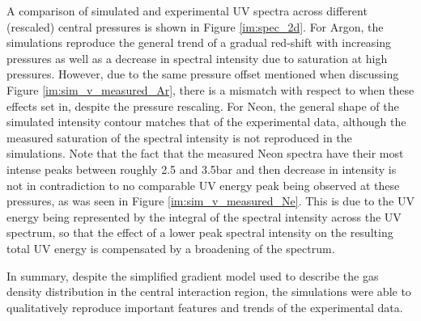 \documentclass[a4paper]{jpconf}
\begin{document}
A comparison of simulated and experimental UV spectra across different (rescaled) central pressures is shown in Figure \ref{im:spec_2d}. For Argon, the simulations reproduce the general trend of a gradual red-shift with increasing pressures as well as a decrease in spectral intensity due to saturation at high pressures. However, due to the same pressure offset mentioned when discussing Figure \ref{im:sim_v_measured_Ar}, there is a mismatch with respect to when these effects set in, despite the pressure rescaling. For Neon, the general shape of the simulated intensity contour matches that of the experimental data, although the measured saturation of the spectral intensity is not reproduced in the simulations. Note that the fact that the measured Neon spectra have their most intense peaks between roughly 2.5 and 3.5bar and then decrease in intensity is not in contradiction to no comparable UV energy peak being observed at these pressures, as was seen in Figure \ref{im:sim_v_measured_Ne}. This is due to the UV energy being represented by the integral of the spectral intensity across the UV spectrum, so that the effect of a lower peak spectral intensity on the resulting total UV energy is compensated by a broadening of the spectrum.  \par 
In summary, despite the simplified gradient model used to describe the gas density distribution in the central interaction region, the simulations were able to qualitatively reproduce important features and trends of the experimental data. 
\end{document}
